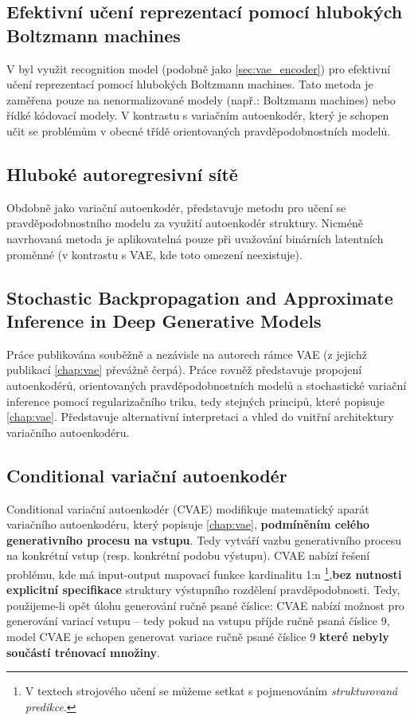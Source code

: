 \subsection{Efektivní učení reprezentací pomocí hlubokých Boltzmann machines}
V \cite{Salakhutdinov2010} byl využit recognition model (podobně jako \autoref{sec:vae_encoder}) pro efektivní učení reprezentací pomocí hlubokých Boltzmann machines. 
Tato metoda je zaměřena pouze na nenormalizované modely (např.: Boltzmann machines) nebo řídké kódovací modely. V kontrastu s variačním autoenkodér, který je schopen učit se problémům v obecné třídě orientovaných pravděpodobnostních modelů. \cite{Kingma2019}

\subsection{Hluboké autoregresivní sítě}
Obdobně jako variační autoenkodér, \cite{Gregor2014} představuje metodu pro učení se pravděpodobnostního modelu za využití autoenkodér struktury. Nicméně navrhovaná metoda je aplikovatelná pouze při uvažování binárních latentních proměnné (v kontrastu s VAE, kde toto omezení neexistuje). \cite{Kingma2019}

\subsection{Stochastic Backpropagation and Approximate Inference in Deep Generative Models}
Práce publikována souběžně a nezávisle na autorech rámce VAE (z jejichž publikací \autoref{chap:vae} převážně čerpá). Práce \cite{Rezende2014} rovněž představuje propojení autoenkodérů, orientovaných pravděpodobnostních modelů a stochastické variační inference pomocí regularizačního triku, tedy stejných principů, které popisuje \autoref{chap:vae}.
Představuje alternativní interpretaci a vhled do vnitřní architektury variačního autoenkodéru.

\subsection{Conditional variační autoenkodér}
Conditional variační autoenkodér (CVAE) \cite{Sohn2015} modifikuje matematický aparát variačního autoenkodéru, který popisuje \autoref{chap:vae}, \textbf{podmíněním celého generativního procesu na vstupu}. Tedy vytváří vazbu generativního procesu na konkrétní vstup (resp. konkrétní podobu výstupu).
CVAE nabízí řešení problému, kde má input-output mapovací funkce kardinalitu 1:n
\footnote{V textech strojového učení se můžeme setkat s pojmenováním \emph{strukturovaná predikce}.},\textbf{bez nutnosti explicitní specifikace} struktury výstupního rozdělení pravděpodobnosti.
Tedy, použijeme-li opět úlohu generování ručně psané číslice: CVAE nabízí možnost pro generování variací vstupu – tedy pokud na vstupu příjde ručně psaná číslice 9, model CVAE je schopen generovat variace ručně psané číslice 9 \textbf{které nebyly součástí trénovací množiny}. \cite{Doersch2021}